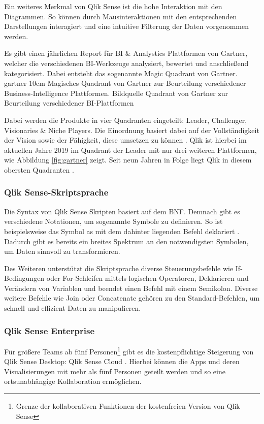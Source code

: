 Ein weiteres Merkmal von Qlik Sense ist die hohe Interaktion mit den Diagrammen.
So können durch Mausinteraktionen mit den entsprechenden Darstellungen interagiert und eine intuitive Filterung der Daten vorgenommen werden.

Es gibt einen jährlichen Report für \gls{BI} \& Analystics Plattformen von Gartner, welcher die verschiedenen BI-Werkzeuge analysiert, bewertet und anschließend kategorisiert.
Dabei entsteht das sogenannte \glqq Magic Quadrant\grqq{} von Gartner.
\bild
{gartner}
{10cm}
{Magisches Quadrant von Gartner zur Beurteilung verschiedener Business-Intelligence Plattformen. Bildquelle \cite{Howson.Februar2019}}
{Quadrant von Gartner zur Beurteilung verschiedener BI-Plattformen}

Dabei werden die Produkte in vier Quadranten eingeteilt: Leader, Challenger, Visionaries \& Niche Players.
Die Einordnung basiert dabei auf der Vollständigkeit der Vision sowie der Fähigkeit, diese umsetzen zu können \cite{Howson.Februar2019}.
Qlik ist hierbei im aktuellen Jahre 2019 im Quadrant der \glqq Leader\grqq{} mit nur drei weiteren Plattformen, wie Abbildung \ref{fig:gartner} zeigt.
Seit neun Jahren in Folge liegt Qlik in diesem obersten Quadranten \cite{QlikTech.2019}.

\subsubsection{Qlik Sense-Skriptsprache}
Die Syntax von Qlik Sense Skripten basiert auf dem \gls{BNF}. 
Demnach gibt es verschiedene Notationen, um sogenannte \glqq Symbole\grqq{} zu definieren.
So ist beispielsweise das Symbol \glqq as\grqq{} mit dem dahinter liegenden Befehl  deklariert \cite{QlikTech.Februar2019}.
Dadurch gibt es bereits ein breites Spektrum an den notwendigsten Symbolen, um Daten sinnvoll zu transformieren.

Des Weiteren unterstützt die Skriptsprache diverse Steuerungsbefehle wie If-Bedingungen oder For-Schleifen mittels logischen Operatoren, Deklarieren und Verändern von Variablen und beendet einen Befehl mit einem Semikolon.
Diverse weitere Befehle wie \glqq Join\grqq{} oder \glqq Concatenate\grqq{} gehören zu den Standard-Befehlen, um schnell und effizient Daten zu manipulieren.

\subsubsection{Qlik Sense Enterprise}
\label{subsub:enterprise}
Für größere Teams ab fünf Personen\footnote{Grenze der kollaborativen Funktionen der kostenfreien Version von Qlik Sense} gibt es die kostenpflichtige Steigerung von Qlik Sense Desktop: Qlik Sense Cloud \cite{QlikTech.2019}.
Hierbei können die Apps und deren Visualisierungen mit mehr als fünf Personen geteilt werden und so eine ortsunabhängige Kollaboration ermöglichen.

